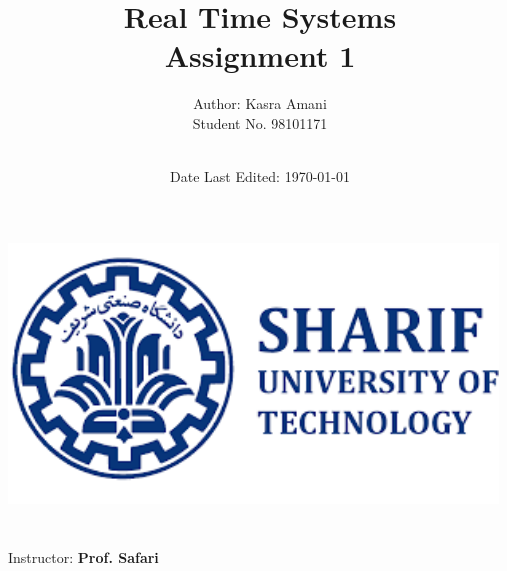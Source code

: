 \title{\Large Real Time Systems  \\[0.5cm]
        \bf\Large Assignment 1}
\author{\large Author: Kasra Amani\\ \normalsize Student No. 98101171 \\ \ \\}
\date{\large Date Last Edited: \today}

\makeatletter
    \begin{titlepage}
        \begin{center}
	   { \includegraphics[width=13cm]{sharif.png}}
	   {\ \\ \ \\}
        \vbox{}\vspace{5cm}
            {\@title }\\[3cm] 
            {\@author}
            {\large Instructor: \bf Prof. Safari\\ \ \\}
            {\@date\\}

        \end{center}
    \end{titlepage}
\makeatother